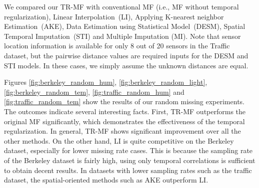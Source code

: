 We compared our TR-MF with conventional MF (i.e., MF without temporal regularization), Linear Interpolation~(LI), 
Applying K-nearest neighbor Estimation~(AKE), Data Estimation using Statistical Model~(DESM), Spatial Temporal Imputation~(STI) and Multiple Imputation (MI).
Note that sensor location information is available for only 8 out of 20 sensors in the Traffic dataset, but the pairwise distance values are required inputs for the DESM and STI models.
In these cases, we simply assume the unknown distances are equal.




Figures \ref{fig:berkeley_random_hum},
\ref{fig:berkeley_random_light}, 
\ref{fig:berkeley_random_tem}, \ref{fig:traffic_random_hum} and \ref{fig:traffic_random_tem} show the results of our random missing experiments.
The outcomes indicate several interesting facts.
First, TR-MF outperforms the original MF significantly, which demonstrates the effectiveness of the temporal regularization.
In general, TR-MF shows significant improvement over all the other methods.
On the other hand, LI is quite competitive on the Berkeley dataset, especially for lower missing rate cases.
This is because the sampling rate of the Berkeley dataset is fairly high, using only temporal correlations is sufficient to obtain decent results.
In datasets with lower sampling rates such as the traffic dataset, the spatial-oriented methods such as AKE outperform LI.

